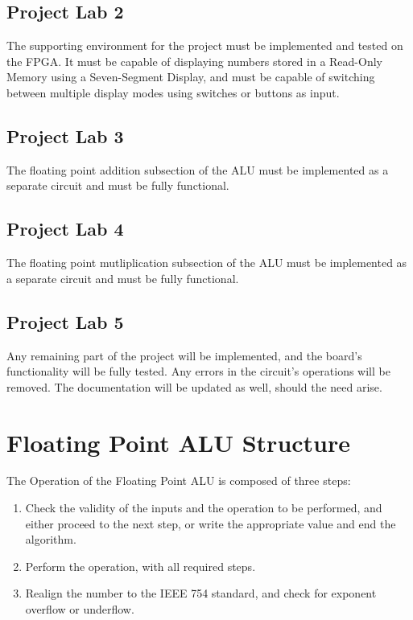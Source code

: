 \documentclass[a4paper,10pt]{article}
\begin{document}
    \subsection{Project Lab 2}
    The supporting environment for the project must be implemented and tested on the FPGA. It must be capable of displaying numbers stored in a Read-Only Memory using a Seven-Segment Display, and must be capable of switching between multiple display modes using switches or buttons as input.

    \subsection{Project Lab 3}
    The floating point addition subsection of the ALU must be implemented as a separate circuit and must be fully functional.

    \subsection{Project Lab 4}
    The floating point mutliplication subsection of the ALU must be implemented as a separate circuit and must be fully functional.

    \subsection{Project Lab 5}
    Any remaining part of the project will be implemented, and the board's functionality will be fully tested. Any errors in the circuit's operations will be removed. The documentation will be updated as well, should the need arise.

    \newpage
    \section{Floating Point ALU Structure}
    The Operation of the Floating Point ALU is composed of three steps:
    \begin{enumerate}
     \item Check the validity of the inputs and the operation to be performed, and either proceed to the next step, or write the appropriate value and end the algorithm.
     \item Perform the operation, with all required steps.
     \item Realign the number to the IEEE 754 standard, and check for exponent overflow or underflow.
    \end{enumerate}
\end{document}
